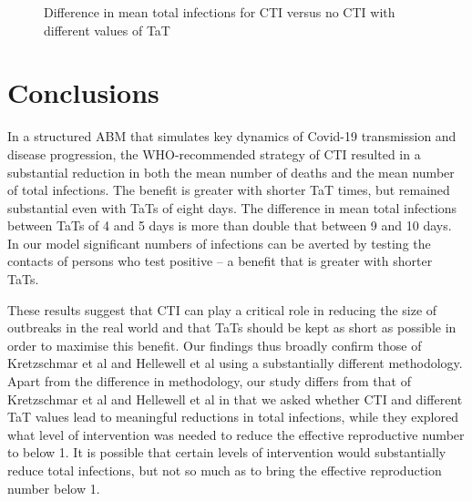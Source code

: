 \documentclass{article}
\begin{document}
\begin{figure}
\begin{center}
\end{center}
\caption{Difference in mean total infections for CTI versus no CTI with
  different values of TaT}
\label{fig:comparisonByTaT}
\end{figure}

\section{Conclusions}\label{conclusions}

In a structured ABM that simulates key dynamics of Covid-19 transmission and
disease progression, the WHO-recommended strategy of CTI resulted in a
substantial reduction in both the mean number of deaths and the mean number of
total infections. The benefit is greater with shorter TaT times, but remained
substantial even with TaTs of eight days. The difference in mean total
infections between TaTs of 4 and 5 days is more than double that between 9 and
10 days. In our model significant numbers of infections can be averted by
testing the contacts of persons who test positive – a benefit that is greater
with shorter TaTs.

These results suggest that CTI can play a critical role in reducing the size of
outbreaks in the real world and that TaTs should be kept as short as possible in
order to maximise this benefit. Our findings thus broadly confirm those of
Kretzschmar et al and Hellewell et al using a substantially different
methodology.\cite{Kretzschmar2020,Hellewell2020} Apart from the difference in
methodology, our study differs from that of Kretzschmar et al and Hellewell et
al in that we asked whether CTI and different TaT values lead to meaningful
reductions in total infections, while they explored what level of intervention
was needed to reduce the effective reproductive number to below 1. It is
possible that certain levels of intervention would substantially reduce total
infections, but not so much as to bring the effective reproduction number below
1.
\end{document}
